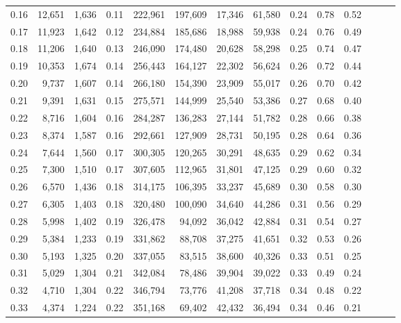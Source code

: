 \begin{tabular}{rrrrrrrrrrrrrr}
0.16 &  12,651 &  1,636 &  0.11 &  222,961 &  197,609 &  17,346 &  61,580 &  0.24 &  0.78 &      0.52 \\
0.17 &  11,923 &  1,642 &  0.12 &  234,884 &  185,686 &  18,988 &  59,938 &  0.24 &  0.76 &      0.49 \\
0.18 &  11,206 &  1,640 &  0.13 &  246,090 &  174,480 &  20,628 &  58,298 &  0.25 &  0.74 &      0.47 \\
0.19 &  10,353 &  1,674 &  0.14 &  256,443 &  164,127 &  22,302 &  56,624 &  0.26 &  0.72 &      0.44 \\
0.20 &   9,737 &  1,607 &  0.14 &  266,180 &  154,390 &  23,909 &  55,017 &  0.26 &  0.70 &      0.42 \\
0.21 &   9,391 &  1,631 &  0.15 &  275,571 &  144,999 &  25,540 &  53,386 &  0.27 &  0.68 &      0.40 \\
0.22 &   8,716 &  1,604 &  0.16 &  284,287 &  136,283 &  27,144 &  51,782 &  0.28 &  0.66 &      0.38 \\
0.23 &   8,374 &  1,587 &  0.16 &  292,661 &  127,909 &  28,731 &  50,195 &  0.28 &  0.64 &      0.36 \\
0.24 &   7,644 &  1,560 &  0.17 &  300,305 &  120,265 &  30,291 &  48,635 &  0.29 &  0.62 &      0.34 \\
0.25 &   7,300 &  1,510 &  0.17 &  307,605 &  112,965 &  31,801 &  47,125 &  0.29 &  0.60 &      0.32 \\
0.26 &   6,570 &  1,436 &  0.18 &  314,175 &  106,395 &  33,237 &  45,689 &  0.30 &  0.58 &      0.30 \\
0.27 &   6,305 &  1,403 &  0.18 &  320,480 &  100,090 &  34,640 &  44,286 &  0.31 &  0.56 &      0.29 \\
0.28 &   5,998 &  1,402 &  0.19 &  326,478 &   94,092 &  36,042 &  42,884 &  0.31 &  0.54 &      0.27 \\
0.29 &   5,384 &  1,233 &  0.19 &  331,862 &   88,708 &  37,275 &  41,651 &  0.32 &  0.53 &      0.26 \\
0.30 &   5,193 &  1,325 &  0.20 &  337,055 &   83,515 &  38,600 &  40,326 &  0.33 &  0.51 &      0.25 \\
0.31 &   5,029 &  1,304 &  0.21 &  342,084 &   78,486 &  39,904 &  39,022 &  0.33 &  0.49 &      0.24 \\
0.32 &   4,710 &  1,304 &  0.22 &  346,794 &   73,776 &  41,208 &  37,718 &  0.34 &  0.48 &      0.22 \\
0.33 &   4,374 &  1,224 &  0.22 &  351,168 &   69,402 &  42,432 &  36,494 &  0.34 &  0.46 &      0.21 \\

\end{tabular}
